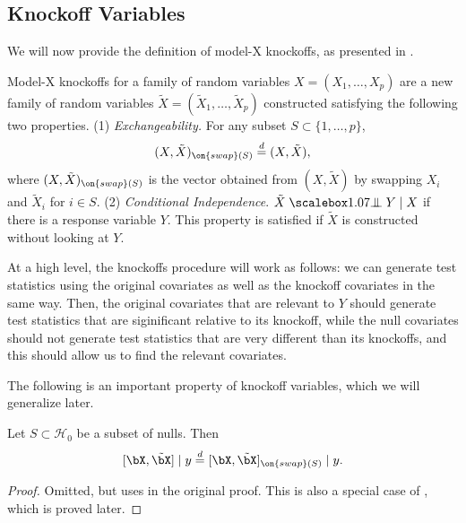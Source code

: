 \subsection{Knockoff Variables}
We will now provide the definition of model-X knockoffs, as presented in \cite{panning}.
\begin{defn}
\label{knockdef}
Model-X knockoffs for a family of random variables $X = (X_1, \ldots, X_p)$ are a new family of random variables $\tilde{X} = (\tilde{X}_1, \ldots, \tilde{X}_p)$ constructed satisfying the following two properties.
 (1) \emph{Exchangeability.} For any subset $S \subset \{ 1, \ldots, p \}$, 
\begin{equation}
(X, \tilde{X})_{\on{swap}(S)} \overset{d}{=} (X, \tilde{X}),
\end{equation}
where $(X, \tilde{X})_{\on{swap}(S)}$ is the vector obtained from $(X, \tilde{X})$ by swapping $X_i$ and $\tilde{X}_i$ for $i \in S$. (2) \emph{Conditional Independence}. $\tilde{X} \indep Y \mid X$ if there is a response variable $Y$. This property is satisfied if $\tilde{X}$ is constructed without looking at $Y$.
\end{defn}
At a high level, the knockoffs procedure will work as follows: we can generate test statistics using the original covariates as well as the knockoff covariates in the same way. Then, the original covariates that are relevant to $Y$ should generate test statistics that are siginificant relative to its knockoff, while the null covariates should not generate test statistics that are very different than its knockoffs, and this should allow us to find the relevant covariates.

The following is an important property of knockoff variables, which we will generalize later.
\begin{lem}
\label{origexchangeofnulls}
Let $S \subset \mathcal{H}_0$ be a subset of nulls. Then
\[ [\bX, \tilde{\bX} ] \mid y \overset{d}{=} [\bX, \tilde{\bX} ]_{\on{swap}(S)} \mid y. \]
\end{lem}
\begin{proof}
Omitted, but uses  in the original proof. This is also a special case of , which is proved later.
\end{proof}
